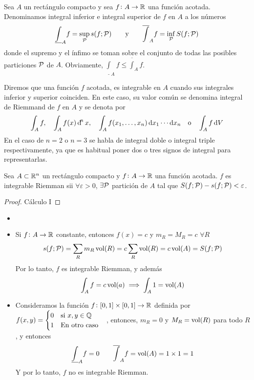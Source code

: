\begin{defi}
	Sea $A$ un rectángulo compacto y sea $f \colon A \to \mathbb{R}$ una función
	acotada. Denominamos integral inferior e integral superior de $f$ en $A$ a los
	números
	\[
		\underline{\int}_A f = \sup_{\mathcal{P}} s(f;\mathcal{P}) \qquad \text{y} \qquad
		\overline{\int}_A f = \inf_{\mathcal{P}} S(f;\mathcal{P})
	\]
	donde el supremo y el ínfimo se toman sobre el conjunto de todas las posibles
	particiones $\mathcal{P}$ de $A$. Obviamente, $\underline{\int}_A f \leq
	\overline{\int}_A f$.
\end{defi}

\begin{defi}
	Diremos que una función $f$ acotada, es integrable en $A$ cuando sus integrales
	inferior y superior coinciden. En este caso, su valor común se denomina
	integral de Riemmand de $f$ en $A$ y se denota por
	\[
		\int_A f, \quad \int_A f(x) \dif^nx, \quad \int_A f(x_1,\dots,x_n)
		\dif x_1 \cdots \dif x_n \quad \text{o} \quad \int_A f \dif V
	\]
	En el caso de $n=2$ o $n=3$ se habla de integral doble o integral triple
	respectivamente, ya que es habitual poner dos o tres signos de integral para
	representarlas.
\end{defi}

\begin{prop}
	Sea $A \subset \mathbb{R}^n$ un rectángulo compacto y $f \colon A \to \mathbb{R}$ una
	función acotada. $f$ es integrable Riemman sii $\forall \varepsilon > 0$,
	$\exists \mathcal{P}$ partición de $A$ tal que $S(f;\mathcal{P})-s(f;\mathcal{P}) < \varepsilon$.
\end{prop}
\begin{proof}
	Cálculo I
\end{proof}

\begin{example*}
	\begin{itemize}
		\item[]
		\item Si $f \colon A \to \mathbb{R}$ constante, entonces  $f(x) = c$ y
			$m_R = M_R = c$ $\forall R$
			\[
				s(f;\mathcal{P}) = \sum_R m_R \operatorname{vol}(R) = c \sum_R \operatorname{vol}(R)
				= c\operatorname{vol}(A) = S(f;\mathcal{P})
			\]
			Por lo tanto, $f$ es integrable Riemman, y además
			\[
				\int_A f = c\operatorname{vol}(a) \implies \int_A 1 = \operatorname{vol}(A)
			\]
		\item Consideramos la función $f \colon [0,1] \times [0,1] \to \mathbb{R}$
			definida por $f(x,y) = \begin{cases}
				0 \quad \text{si } x,y \in \mathbb{Q} \\
				1 \quad \text{En otro caso}
			\end{cases}$, entonces, $m_R = 0$ y $M_R = \operatorname{vol}(R)$ para todo
			$R$, y entonces
			\[
				\underline{\int}_A f = 0 \qquad
				\overline{\int}_A f = \operatorname{vol}(A) = 1\times1 = 1
			\]
			Y por lo tanto, $f$ no es integrable Riemman.
	\end{itemize}
\end{example*}

